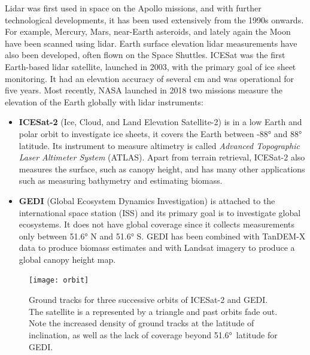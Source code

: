 %

Lidar was first used in space on the Apollo missions, and with further technological developments, it has been used extensively from the 1990s onwards.
For example, Mercury, Mars, near-Earth asteroids, and lately again the Moon have been scanned using lidar.
Earth surface elevation lidar measurements have also been developed, often flown on the Space Shuttles.
ICESat was the first Earth-based lidar satellite, launched in 2003, with the primary goal of ice sheet monitoring.
It had an elevation accuracy of several cm and was operational for five years.
Most recently, NASA launched in 2018 two missions measure the elevation of the Earth globally with lidar instruments:

\begin{itemize}
  \item \textbf{ICESat-2}
        (Ice, Cloud, and Land Elevation Satellite-2) is in a low Earth and polar orbit to investigate ice sheets, it covers the Earth between \ang{-88} and \ang{88} latitude.
        Its instrument to measure altimetry is called \emph{Advanced Topographic Laser Altimeter System} (ATLAS).
        Apart from terrain retrieval, ICESat-2 also measures the surface, such as canopy height, and has many other applications such as measuring bathymetry and estimating biomass.
  \item \textbf{GEDI}
        (Global Ecosystem Dynamics Investigation) is attached to the international space station (ISS) and its primary goal is to investigate global ecosystems.
        It does not have global coverage since it collects measurements only between \ang{51.6} N and \ang{51.6} S.
        GEDI has been combined with TanDEM-X data to produce biomass estimates and with Landsat imagery to produce a global canopy height map.
\end{itemize}
\begin{figure}
  \centering
  \texttt{[image: orbit]}
  \caption{Ground tracks for three successive orbits of ICESat-2 and GEDI\@. The satellite is a represented by a triangle and past orbits fade out. Note the increased density of ground tracks at the latitude of inclination, as well as the lack of coverage beyond \ang{51.6}~latitude for GEDI.}%
  \label{fig:orbit}
\end{figure}

%


